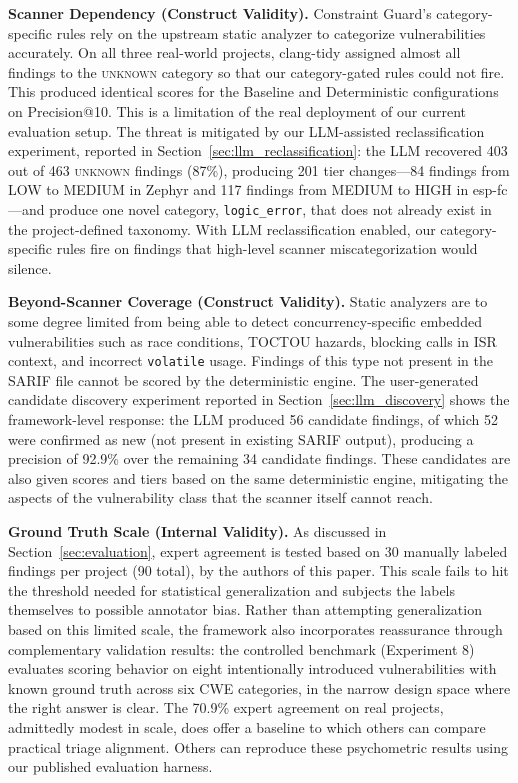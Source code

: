 \textbf{Scanner Dependency (Construct Validity).}
Constraint Guard's category-specific rules rely on the upstream static analyzer to categorize vulnerabilities accurately. On all three real-world projects, clang-tidy assigned almost all findings to the \textsc{unknown} category so that our category-gated rules could not fire. This produced identical scores for the Baseline and Deterministic configurations on Precision@10. This is a limitation of the real deployment of our current evaluation setup. The threat is mitigated by our LLM-assisted reclassification experiment, reported in Section~\ref{sec:llm_reclassification}: the LLM recovered 403 out of 463 \textsc{unknown} findings (87\%), producing 201 tier changes---84 findings from LOW to MEDIUM in Zephyr and 117 findings from MEDIUM to HIGH in esp-fc---and produce one novel category, \texttt{logic\_error}, that does not already exist in the project-defined taxonomy. With LLM reclassification enabled, our category-specific rules fire on findings that high-level scanner miscategorization would silence.

\textbf{Beyond-Scanner Coverage (Construct Validity).}
Static analyzers are to some degree limited from being able to detect concurrency-specific embedded vulnerabilities such as race conditions, TOCTOU hazards, blocking calls in ISR context, and incorrect \texttt{volatile} usage. Findings of this type not present in the SARIF file cannot be scored by the deterministic engine. The user-generated candidate discovery experiment reported in Section~\ref{sec:llm_discovery} shows the framework-level response: the LLM produced 56 candidate findings, of which 52 were confirmed as new (not present in existing SARIF output), producing a precision of 92.9\% over the remaining 34 candidate findings. These candidates are also given scores and tiers based on the same deterministic engine, mitigating the aspects of the vulnerability class that the scanner itself cannot reach.

\textbf{Ground Truth Scale (Internal Validity).}
As discussed in Section~\ref{sec:evaluation}, expert agreement is tested based on 30 manually labeled findings per project (90 total), by the authors of this paper. This scale fails to hit the threshold needed for statistical generalization and subjects the labels themselves to possible annotator bias. Rather than attempting generalization based on this limited scale, the framework also incorporates reassurance through complementary validation results: the controlled benchmark (Experiment 8) evaluates scoring behavior on eight intentionally introduced vulnerabilities with known ground truth across six CWE categories, in the narrow design space where the right answer is clear. The 70.9\% expert agreement on real projects, admittedly modest in scale, does offer a baseline to which others can compare practical triage alignment. Others can reproduce these psychometric results using our published evaluation harness.

